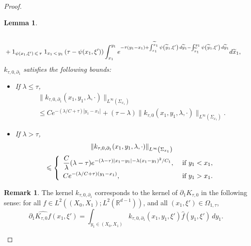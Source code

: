 \documentclass[10pt]{amsart}
\newtheorem{lemm}[theo]{Lemma}\newtheorem{prop}[theo]{Proposition}\newtheorem{coro}[theo]{Corollary}\newtheorem{conj}[theo]{Conjecture}
\theoremstyle{definition}\newtheorem{defi}[theo]{Definition}\newtheorem{rema}[theo]{Remark}\newtheorem{exam}[theo]{Example}\newtheorem{exem}[theo]{Example}\newtheorem{nota}[theo]{Notation}
\newcommand*\R{\mathbb{R}}
\newcommand*\ds{\displaystyle}
\renewcommand{\leq}{\leqslant}
\renewcommand{\tilde}{\widetilde}
\let\oldtilde\tilde
\renewcommand*{\tilde}[1]{\mathchoice{\widetilde{#1}}{\widetilde{#1}}{\oldtilde{#1}}{\oldtilde{#1}}}
\begin{document}
\begin{proof}
\begin{lemm}
\begin{multline}
\begin{aligned}
\\
& + 1_{\psi(x_1, \xi')\,\leq\,\tau}\; 1_{x_1\,<\,y_1} \left(\tau - \psi(x_1, \xi')\right) \int_{x_1}^{y_1} e^{-\tau(y_1-x_1) + \int_{x_1}^{\tilde x_1} \psi\left(\tilde y_1, \xi'\right) \, d\tilde y_1 - \int_{\tilde x_1}^{y_1} \psi\left(\tilde y_1, \xi'\right) \, d\tilde y_1} d\tilde x_1,
\end{aligned}
\end{multline}
$k_{\tau,0,\partial_1}$ satisfies the following bounds:
\begin{itemize}
\item If $\lambda \leq \tau$,
\begin{multline}\label{Est-k-tau-0-d1-x1-y1-Low-Freq}
\|k_{\tau, 0, \partial_1}(x_1,y_1,\lambda, \cdot) \|_{L^\infty\left(\Sigma_{x_1}\right)}\\
\leq C e^{-(\lambda/C+\tau)|y_1 -x_1|} + (\tau -\lambda)
\| k_{\tau,0}(x_1, y_1,\lambda, \cdot)\|_{L^\infty\left(\Sigma_{x_1}\right)}.
\end{multline}
\item If $\lambda > \tau$,
\begin{multline}\label{Est-k-tau-0-d1-x1-y1-High-Freq}
\|k_{\tau, 0, \partial_1}(x_1,y_1,\lambda, \cdot) \|_{L^\infty\left(\Sigma_{x_1}\right)}\\
\leq
\left\{
\begin{array}{ll}
\ds
\frac{C}{\lambda} (\lambda - \tau) e^{-(\lambda-\tau) |x_1-y_1|- \lambda (x_1-y_1)^2/C_1}, & \text{ if } y_1<x_1,
\smallskip
\\
\ds C e^{-(\lambda/C + \tau)(y_1 - x_1)}, & \text{ if } y_1>x_1.
\end{array}
\right.
\end{multline}
\end{itemize}
\end{lemm}

\begin{rema}
The kernel $k_{\tau,0, \partial_1}$ corresponds to the kernel of $\partial_1 K_{\tau,0}$ in the following sense: for all $f \in L^2((X_0,X_1); L^2(\R^{d-1}))$, and all $(x_1, \xi') \in \Omega_{1, \tau}$,
\begin{equation}\label{d1-Hat-K}
\partial_1 \widehat{K_{\tau, 0} f}(x_1,\xi') = \int_{y_1 \in (X_0,X_1)} k_{\tau,0, \partial_1}(x_1, y_1, \xi') \widehat f(y_1, \xi') \, dy_1.
\end{equation}
\end{rema}


\end{proof}
\end{document}
